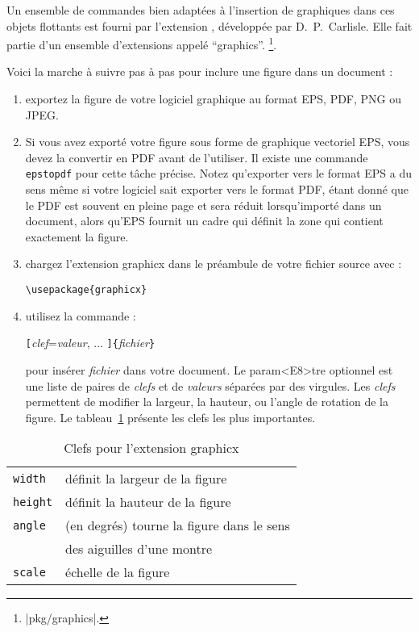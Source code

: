 Un ensemble de commandes bien adaptées à l'insertion de graphiques dans ces objets flottants est
fourni par l'extension , développée par D.~P.~Carlisle. Elle
fait partie d'un ensemble d'extensions appelé \enquote{graphics}.
\footnote{\CTAN|pkg/graphics|.}.

Voici la marche à suivre pas à pas pour inclure une
figure dans un document :

\begin{enumerate}
\item exportez la figure de votre logiciel graphique au format EPS, PDF, PNG ou JPEG.
\item Si vous avez exporté votre figure sous forme de graphique
  vectoriel EPS, vous devez la convertir en PDF avant de
  l'utiliser. Il existe une commande \texttt{epstopdf} pour cette
  tâche précise. Notez qu'exporter vers le format EPS a du sens même
  si votre logiciel sait exporter vers le format PDF, étant donné que
  le PDF est souvent en pleine page et sera réduit lorsqu'importé dans
  un document, alors qu'EPS fournit un cadre qui définit la zone qui
  contient exactement la figure.
\item chargez l'extension \textsf{graphicx} dans le préambule de votre
      fichier source avec :
\begin{lscommand}
\verb|\usepackage{graphicx}|
\end{lscommand}
\item utilisez la commande :
\begin{lscommand}
\verb|[|\emph{clef}=\emph{valeur}, ... \verb|]{|\emph{fichier}\verb|}|
\end{lscommand}
\noindent pour insérer \emph{fichier} dans votre document. Le param<E8>tre
optionnel est une liste de paires de \emph{clefs} et de \emph{valeurs}
séparées par des virgules. Les \emph{clefs} permettent de modifier la
largeur, la hauteur, ou l'angle de rotation de la figure. Le
tableau~\ref{keyvals} présente les clefs les plus importantes.
\end{enumerate}

\begin{table}[tb]
\caption{Clefs pour l'extension \textsf{graphicx}}
\label{keyvals}
\begin{lined}{9cm}
\begin{tabular}{@{}ll}
\texttt{width}& définit la largeur de la figure\\
\texttt{height}& définit la hauteur de la figure\\
\texttt{angle}& (en degrés) tourne la figure dans le sens \\
&  des aiguilles d'une montre \\
\texttt{scale}& échelle de la figure
\end{tabular}

\bigskip
\end{lined}
\end{table}

